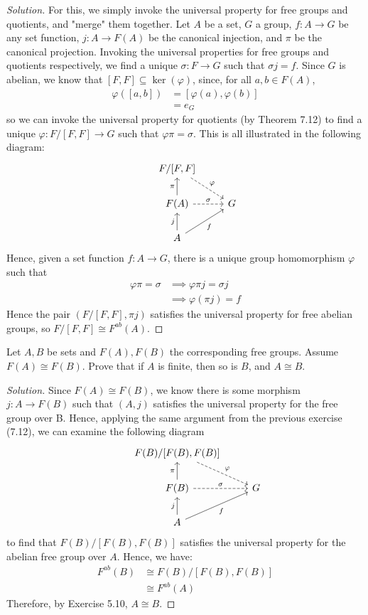 \documentclass[12pt]{article}
\newenvironment{problem}[2][Problem]{\begin{trivlist}
\item[\hskip \labelsep {\bfseries #1}\hskip \labelsep {\bfseries #2.}]}{\end{trivlist}}
\newenvironment{solution}
  {\renewcommand\qedsymbol{$\blacksquare$}\begin{proof}[Solution]}
{\end{proof}}
\theoremstyle{remark}
\begin{document}
\begin{solution}
  For this, we simply invoke the universal property for free groups and quotients, and "merge" them together.
  Let $A$ be a set, $G$ a group, $f:A\to G$ be any set function, $j:A\to F(A)$ be the canonical injection,
  and $\pi$ be the canonical projection.
  Invoking the universal properties for free groups and quotients respectively, 
  we find a unique $\sigma:F\to G$ such that $\sigma j = f$. 
  Since $G$ is abelian, we know that $[F,F] \subseteq \ker(\varphi)$, since, for all $a,b\in F(A)$,
  \begin{align*}
    \varphi([a,b]) &= [\varphi(a), \varphi(b)] \\
    &= e_G
  \end{align*}
  so we can invoke the universal property for quotients (by Theorem 7.12) to find a 
  unique $\varphi:F/[F,F]\to G$ such that $\varphi\pi = \sigma$.
  This is all illustrated in the following diagram:
  \[\begin{tikzcd}
      & F/[F,F] \ar[dashed]{dr}{\varphi} & \\
    & F(A) \ar{u}{\pi} \ar[dashed]{r}{\sigma} & G \\
    & A \ar{u}{j} \ar{ur}[swap]{f} &
  \end{tikzcd}\]
  Hence, given a set function $f:A\to G$, there is a unique group homomorphism $\varphi$ such that
  \begin{align*}
    \varphi\pi = \sigma &\implies \varphi\pi j = \sigma j \\
    &\implies \varphi(\pi j) = f 
  \end{align*}
  Hence the pair $(F/[F,F], \pi j)$ satisfies the universal property for free abelian groups, 
  so $F/[F,F]\cong F^{ab}(A)$.
\end{solution}
\begin{problem}{7.13}
  Let $A,B$ be sets and $F(A), F(B)$ the corresponding free groups.
  Assume $F(A)\cong F(B)$.
  Prove that if $A$ is finite, then so is $B$, and $A\cong B$.
\end{problem}
\begin{solution}
  Since $F(A)\cong F(B)$, we know there is some morphism $j:A\to F(B)$ such that $(A, j)$
  satisfies the universal property for the free group over B. 
  Hence, applying the same argument from the previous exercise (7.12), we can examine the following diagram
  \[\begin{tikzcd}
      & F(B)/[F(B),F(B)] \ar[dashed]{dr}{\varphi} & \\
    & F(B) \ar{u}{\pi} \ar[dashed]{r}{\sigma} & G \\
    & A \ar{u}{j} \ar{ur}[swap]{f} &
  \end{tikzcd}\]
  to find that $F(B)/[F(B),F(B)]$ satisfies the universal property for the abelian free group over $A$.
  Hence, we have:
  \begin{align*}
    F^{ab}(B) &\cong F(B)/[F(B),F(B)] \\
    &\cong F^{ab}(A)
  \end{align*}
  Therefore, by Exercise 5.10, $A\cong B$.
\end{solution}
\end{document}
